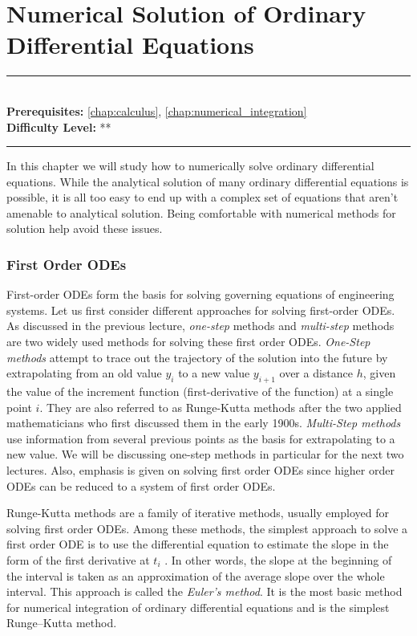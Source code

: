 \documentclass[book.tex]{subfiles}
\begin{document}
\chapter{Numerical Solution of Ordinary Differential Equations}
\label{chap:numerical_ode}
\noindent\rule{11cm}{0.4pt} \\
\textbf{Prerequisites:} \autoref{chap:calculus}, \autoref{chap:numerical_integration} \\
\textbf{Difficulty Level:} ** \\
\noindent\rule{11cm}{0.4pt}
\vspace{5mm}

In this chapter we will study how to numerically solve ordinary differential equations. While the analytical solution of many ordinary differential equations is possible, it is all too easy to end up with a complex set of equations that aren't amenable to analytical solution. Being comfortable with numerical methods for solution help avoid these issues.

\subsection{First Order ODEs}
First-order ODEs form the basis for solving governing equations of engineering systems. Let us first consider different approaches for solving first-order ODEs. As discussed in the previous lecture, \textit{one-step} methods and \textit{multi-step} methods are two widely used methods for solving these first order ODEs. \textit{One-Step methods} attempt to trace out the trajectory of the solution into the future by extrapolating from an old value $y_i$ to a new value $y_{i+1}$ over a distance $h$, given the value of the increment function (first-derivative of the function) at a single point $i$. They are also referred to as Runge-Kutta methods after the two applied mathematicians who first discussed them in the early 1900s. \textit{Multi-Step methods} use information from several previous points as the basis for extrapolating to a new value. We will be discussing one-step methods in particular for the next two lectures. Also, emphasis is given on solving first order ODEs since higher order ODEs can be reduced to a system of first order ODEs. 

Runge-Kutta methods are a family of iterative methods, usually employed for solving first order ODEs. Among these methods, the simplest approach to solve a first order ODE is to use the differential equation to estimate the slope in the form of the first derivative at $t_i$ . In other words, the slope at the beginning of the interval is taken as an approximation of the average slope over the whole interval. This approach is called the \textit{Euler’s method}. It is the most basic method for numerical integration of ordinary differential equations and is the simplest Runge–Kutta method.
\end{document}

